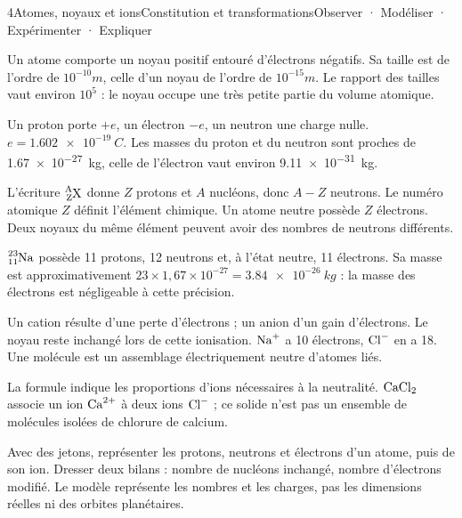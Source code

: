\begin{ouverture}[radioactivite]{4}{Atomes, noyaux et ions}{Constitution et transformations}{Observer · Modéliser · Expérimenter · Expliquer}
\end{ouverture}
\essentiel
{}
Un atome comporte un noyau positif entouré d'électrons négatifs. Sa taille est de l'ordre de $10^{-10}\unit{m}$, celle d'un noyau de l'ordre de $10^{-15}\unit{m}$. Le rapport des tailles vaut environ $10^5$ : le noyau occupe une très petite partie du volume atomique.
\begin{definition}[Constituants]Un proton porte $+e$, un électron $-e$, un neutron une charge nulle. $e=\qty{1,602e-19}{C}$. Les masses du proton et du neutron sont proches de \qty{1,67e-27}{kg}, celle de l'électron vaut environ \qty{9,11e-31}{kg}.\end{definition}
L'écriture $\ce{^{A}_{Z}X}$ donne $Z$ protons et $A$ nucléons, donc $A-Z$ neutrons. Le numéro atomique $Z$ définit l'élément chimique. Un atome neutre possède $Z$ électrons. Deux noyaux du même élément peuvent avoir des nombres de neutrons différents.
\begin{exemple}$\ce{^{23}_{11}Na}$ possède 11 protons, 12 neutrons et, à l'état neutre, 11 électrons. Sa masse est approximativement $23\times1,67\times10^{-27}=\qty{3,84e-26}{kg}$ : la masse des électrons est négligeable à cette précision.\end{exemple}
Un cation résulte d'une perte d'électrons ; un anion d'un gain d'électrons. Le noyau reste inchangé lors de cette ionisation. $\ce{Na+}$ a 10 électrons, $\ce{Cl-}$ en a 18. Une molécule est un assemblage électriquement neutre d'atomes liés.
\begin{propriete}La formule indique les proportions d'ions nécessaires à la neutralité. $\ce{CaCl2}$ associe un ion $\ce{Ca^{2+}}$ à deux ions $\ce{Cl-}$ ; ce solide n'est pas un ensemble de molécules isolées de chlorure de calcium.\end{propriete}
\begin{experience}Avec des jetons, représenter les protons, neutrons et électrons d'un atome, puis de son ion. Dresser deux bilans : nombre de nucléons inchangé, nombre d'électrons modifié. Le modèle représente les nombres et les charges, pas les dimensions réelles ni des orbites planétaires.\end{experience}
